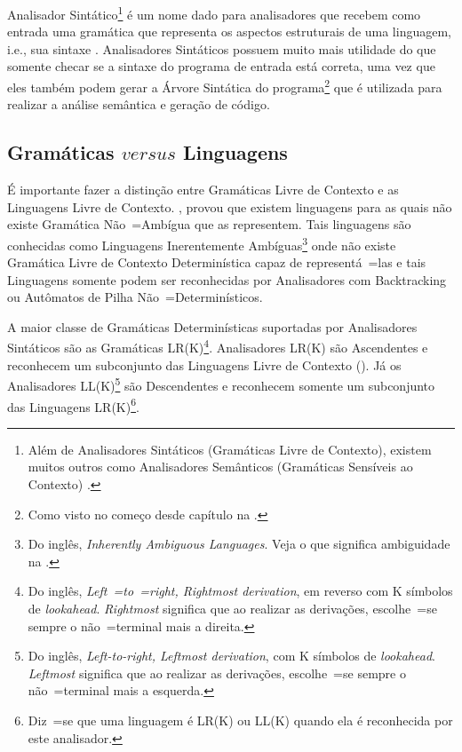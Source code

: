 Analisador Sintático\footnote{
Além de Analisadores Sintáticos (Gramáticas Livre de Contexto),
existem muitos outros como Analisadores Semânticos (Gramáticas Sensíveis ao Contexto) \cite{contextSensitiveParsing}.
}
é um nome dado para analisadores que recebem como entrada uma gramática que representa os aspectos estruturais de uma linguagem,
i.e.,
sua sintaxe \cite{ahoCompilerDragonBook}.
Analisadores Sintáticos possuem muito mais utilidade do que somente checar se a sintaxe do programa de entrada está correta,
uma vez que eles também podem gerar a Árvore Sintática do programa\footnote{
Como visto no começo desde capítulo na .
}
que é utilizada para realizar a análise semântica e
geração de código.


\subsection{Gramáticas $versus$ Linguagens}
\label{gramaticasVersusLinguagens}

É importante fazer a distinção entre Gramáticas Livre de Contexto e
as Linguagens Livre de Contexto.
,
provou que existem linguagens para as quais não existe Gramática Não~=Ambígua que as representem.
Tais linguagens são conhecidas como Linguagens Inerentemente Ambíguas\footnote{
Do inglês,
\textit{Inherently Ambiguous Languages}.
Veja o que significa ambiguidade na .
}
onde não existe Gramática Livre de Contexto Determinística capaz de representá~=las e
tais Linguagens somente podem ser reconhecidas por Analisadores com Backtracking \cite{ahoCompilerDragonBook} ou
Autômatos de Pilha Não~=Determinísticos.

A maior classe de Gramáticas Determinísticas suportadas por Analisadores Sintáticos são as Gramáticas LR(K)\footnote{
Do inglês, \textit{Left~=to~=right, Rightmost derivation},
em reverso com K símbolos de \textit{lookahead}.
\textit{Rightmost} significa que ao realizar as derivações,
escolhe~=se sempre o não~=terminal mais a direita.
}.
Analisadores LR(K) \cite{ahoCompilerDragonBook} são Ascendentes e
reconhecem um subconjunto das Linguagens Livre de Contexto ().
Já os Analisadores LL(K)\footnote{
Do inglês, \textit{Left-to-right, Leftmost derivation},
com K símbolos de \textit{lookahead}.
\textit{Leftmost} significa que ao realizar as derivações,
escolhe~=se sempre o não~=terminal mais a esquerda.
}
são Descendentes \cite{antlrBookTerrentParr,llStarAntlr,allStarAntlr} e
reconhecem somente um subconjunto das Linguagens LR(K)\footnote{
Diz~=se que uma linguagem é LR(K) ou
LL(K) quando ela é reconhecida por este analisador.
}.

